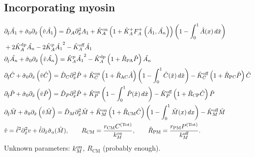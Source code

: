 \documentclass[11pt]{article}
\newcommand{\6}[1]{#1_{\text{6}}}
\newcommand{\3}[1]{#1_{\text{3}}}
\newcommand{\Tot}[1]{#1^\text{(Tot)}}
\newcommand{\A}[1]{#1_A}
\begin{document}
\subsection{Incorporating myosin}
\begin{subequations}
\label{eq:Everything}
\begin{align}
\nonumber
&\Dthat \hat{\MA}  +\hat{\sigma}_0  \Dxhat \left(\hat{v} \hat{\MA} \right) = \DhatA \Dxhat^2 \MA +\KhatonA \left(1+\KhatfA \A{F}^+\left(\hat{\MA},\hat{\PA}\right)\right)\left(1 - \int_0^1 \hat{A}(x) \, d\hat{x} \right) \\ 
&+ 2\KhatdpA \hat{\PA}-2\KhatpA \hat{\MA}^2 - \KhatoffA \hat{\MA} \\ 
&\Dthat \hat{\PA} +\hat{\sigma}_0  \Dxhat \left(\hat{v} \hat{\PA} \right)  =\KhatpA \hat{\MA}^2- \KhatdpA \left(1+\hat{R}_\text{PA}\hat{P}\right) \hat{\PA} \\ 
\label{eq:26c}
&\Dthat \hat{C} +\hat{\sigma}_0  \Dxhat \left(\hat{v} \hat{C} \right) =\DhatC \Dxhat^2 \hat{P} +\KhatonC \left(1+\hat R_\text{AC}\hat{A} \right)\left(1 - \int_0^1 \hat{C}(\hat x) \, d\hat{x} \right)  - \KhatoffC \left(1+\hat{R}_\text{PC}\hat P\right)\hat{C} \\ 
&\Dthat \hat{P} +\hat{\sigma}_0  \Dxhat \left(\hat{v} \hat{P} \right)   =\DhatP \Dxhat^2 \hat{P} +\KhatonP \left(1 - \int_0^1 \hat{P}(\hat x) \, d\hat{x} \right)  - \KhatoffP \left(1+\hat{R}_\text{CP}\hat C\right) \hat{P} \\ 
&\Dthat \hat{M} +\hat{\sigma}_0  \Dxhat \left(\hat{v} \hat{M} \right) =\hat{D}_M \Dxhat^2 \hat{M} +\KhatonM \left(1+\hat{R}_\text{CM} \hat C\right) \left(1-\int_0^1  \hat{M}(x) \, dx\right)- \KhatoffM \hat{M}\\
&\hat{v} = \hat{\ell}^2 \Dxhat^2 v +\hat{\ell} \Dxhat \hat{\sigma}_a(\hat{M}),\qquad  R_\text{CM}=\frac{r_\text{CM}\Tot{C}}{\kon_M},\qquad \hat{R}_\text{PM}=\frac{r_\text{PM}\Tot{P}}{\koff_M}.
\end{align}
\end{subequations}
Unknown parameters: $k^\text{on}_M$, $R_\text{CM}$ (probably enough). 

\iffalse
\end{document}
